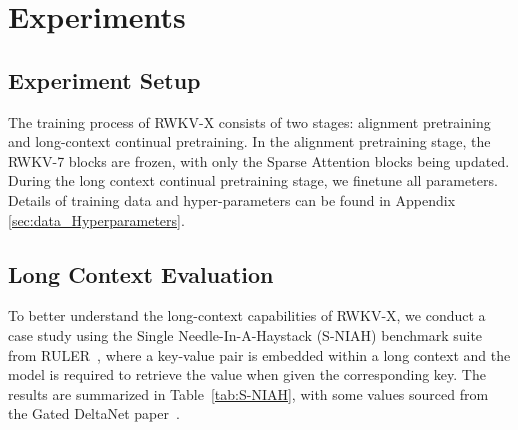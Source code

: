 \section{Experiments}

\subsection{Experiment Setup}
The training process of RWKV-X consists of two stages: alignment pretraining and long-context continual pretraining. In the alignment pretraining stage, the RWKV-7 blocks are frozen, with only the Sparse Attention blocks being updated. During the long context continual pretraining stage, we finetune all parameters. Details of training data and hyper-parameters can be found in Appendix \ref{sec:data_Hyperparameters}.

\subsection{Long Context Evaluation}
To better understand the long-context capabilities of RWKV-X, we conduct a case study using the Single Needle-In-A-Haystack (S-NIAH) benchmark suite from RULER~\citep{hsieh2024rulerwhatsrealcontext}, where a key-value pair is embedded within a long context and the model is required to retrieve the value when given the corresponding key. 
The results are summarized in Table~\ref{tab:S-NIAH}, with some values sourced from the Gated DeltaNet paper~\cite{yang2024gated}.

